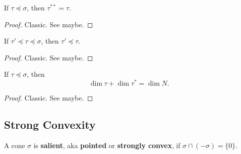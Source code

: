\begin{proposition}
  \label{3-double-dual-face-dual-face}
  If $\tau \preceq \sigma$, then $\tau^{**} = \tau$.
\end{proposition}
\begin{proof}

  Classic. See \cite{Oda_1988} maybe.
\end{proof}


\begin{proposition}
  \label{3-dual-face-antitone}

  If $\tau' \preceq \tau \preceq \sigma$, then $\tau' \preceq \tau$.
\end{proposition}
\begin{proof}
  \uses{}

  Classic. See \cite{Oda_1988} maybe.
\end{proof}


\begin{proposition}
  \label{3-dim-dual-face}

  If $\tau \preceq \sigma$, then
  $$\dim \tau + \dim \tau^* = \dim N.$$
\end{proposition}
\begin{proof}
  \uses{}

  Classic. See \cite{Oda_1988} maybe.
\end{proof}



\subsection{Strong Convexity}


\begin{definition}
  \label{02-salient-cone}
  \uses{}
  \leanok

  A cone $\sigma$ is {\bf salient}, aka {\bf pointed} or {\bf strongly convex}, if $\sigma \cap (-\sigma) = \{0\}$.
\end{definition}


